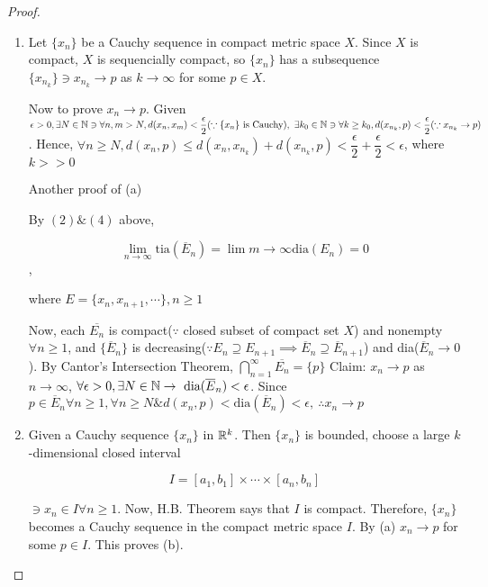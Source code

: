\begin{proof}
	\begin{enumerate}[wide,label = $(\alph*)$]
		\item Let $\{x_n\}$ be a Cauchy sequence in compact metric space $X$. Since $X$ is compact, $X$ is sequencially compact, so $\{x_n\}$ has a subsequence $\{x_{n_k}\} \ni x_{n_k} \rightarrow p$ as $k \rightarrow \infty$ for some $p \in X$.
		
		Now to prove $x_n \rightarrow p$. Given $\epsilon > 0, \exists N \in \mathbb{N} \ni \forall n,m > N , d(x_n,x_m) < \dfrac{\epsilon}{2}(\because \{x_n\} \text{ is Cauchy}),~ \exists k_0 \in \mathbb{N} \ni \forall k \geq k_0, d(x_{n_k},p) < \dfrac{\epsilon}{2}(\because x_{n_k} \rightarrow p)$. Hence, $\forall n \geq N, d(x_n,p) \leq d(x_n,x_{n_k}) + d(x_{n_k},p) < \dfrac{\epsilon}{2} + \dfrac{\epsilon}{2} < \epsilon$, where $k >> 0 $
		
		Another proof of (a)
		
		By $(2) \& (4)$ above,
		
		$$\lim_{n \rightarrow \infty} \text{tia}(\overline{E}_n) = \lim{m \rightarrow \infty} \text{dia}(E_n) = 0$$,
		
		where $E = \{x_n , x_{n+1},\cdots\}, n \geq 1$
		
		Now, each $\overline{E_n}$ is compact($\because$ closed subset of compact set $X$) and nonempty $\forall n \geq 1$, and $\{\overline{E}_n\}$ is decreasing($\because E_n \supseteq E_{n+1} \implies \overline{E}_n \supseteq \overline{E}_{n+1}$) and dia($\overline{E}_n \rightarrow 0$). By Cantor's Intersection Theorem, $\bigcap^{\infty}_{n = 1}\overline{E_n} = \{p\}$
		Claim: $x_n \rightarrow p$ as $n \rightarrow \infty$, $\forall \epsilon > 0, \exists N \in \mathbb{N} \rightarrow \text{ dia}(\overline{E}_n) < \epsilon$. Since $p \in \overline{E}_n \forall n \geq 1, \forall n \geq N \& d(x_n,p) < \text{dia}(\overline{E}_n) < \epsilon,~\therefore x_n \rightarrow p$
		
		\item Given a Cauchy sequence $\{x_n\}$ in $\mathbb{R}^k$. Then $\{x_n\}$ is bounded, choose a large $k$-dimensional closed interval
		
		$$I = [a_1,b_1] \times \cdots \times [a_n,b_n]$$
		
		$\ni x_n \in I \forall n \geq 1$. Now, H.B. Theorem says that $I$ is compact. Therefore, $\{x_n\}$ becomes a Cauchy sequence in the compact metric space $I$. By (a) $x_n \rightarrow p$ for some $p \in I$. This proves (b).
	\end{enumerate}
	
\end{proof}

